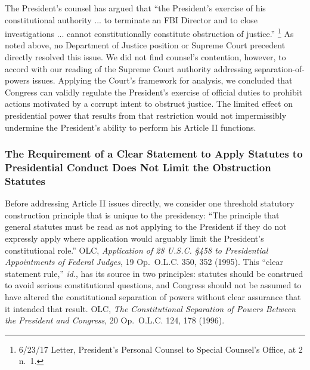 The President’s counsel has argued that “the President’s exercise of his constitutional authority ... to terminate an FBI Director and to close investigations ... cannot constitutionally constitute obstruction of justice.”%
\footnote{6/23/17 Letter, President’s Personal Counsel to Special Counsel’s Office, at 2 n.~1.}
As noted above, no Department of Justice position or Supreme Court precedent directly resolved this issue.
We did not find counsel’s contention, however, to accord with our reading of the Supreme Court authority addressing separation-of-powers issues.
Applying the Court’s framework for analysis, we concluded that Congress can validly regulate the President’s exercise of official duties to prohibit actions motivated by a corrupt intent to obstruct justice.
The limited effect on presidential power that results from that restriction would not impermissibly undermine the President’s ability to perform his Article II functions.

\subsubsection{The Requirement of a Clear Statement to Apply Statutes to Presidential Conduct Does Not Limit the Obstruction Statutes}

Before addressing Article II issues directly, we consider one threshold statutory construction principle that is unique to the presidency: “The principle that general statutes must be read as not applying to the President if they do not expressly apply where application would arguably limit the President’s constitutional role.”
OLC, \textit{Application of 28 U.S.C. \S 458 to Presidential Appointments of Federal Judges}, 19 Op.\ O.L.C. 350, 352 (1995).
This “clear statement rule,” \textit{id}., has its source in two principles: statutes should be construed to avoid serious constitutional questions, and Congress should not be assumed to have altered the constitutional separation of powers without clear assurance that it intended that result.
OLC, \textit{The Constitutional Separation of Powers Between the President and Congress}, 20 Op.\ O.L.C. 124, 178 (1996).

